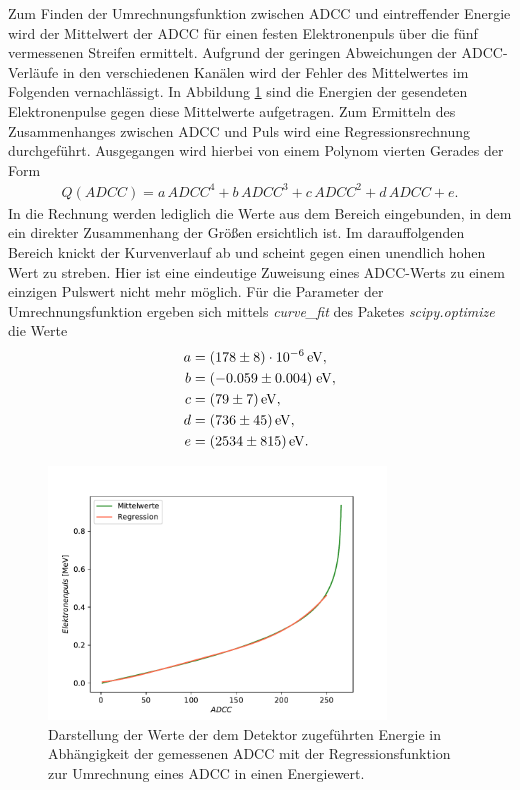 Zum Finden der Umrechnungsfunktion zwischen ADCC und eintreffender Energie wird der Mittelwert der ADCC für einen festen Elektronenpuls über die fünf vermessenen Streifen ermittelt. Aufgrund der geringen Abweichungen der ADCC-Verläufe in den verschiedenen Kanälen wird der Fehler des Mittelwertes im Folgenden vernachlässigt. In Abbildung \ref{fig:Regression} sind die Energien der gesendeten Elektronenpulse gegen diese Mittelwerte aufgetragen. Zum Ermitteln des Zusammenhanges zwischen ADCC und Puls wird eine Regressionsrechnung durchgeführt. Ausgegangen wird hierbei von einem Polynom vierten Gerades der Form
\begin{align}
  Q(ADCC) = a\,ADCC^4 + b\,ADCC^3 + c\,ADCC^2 + d\,ADCC + e.
  \label{eq:Kalib}
\end{align}
In die Rechnung werden lediglich die Werte aus dem Bereich eingebunden, in dem ein direkter Zusammenhang der Größen ersichtlich ist. Im darauffolgenden Bereich knickt der Kurvenverlauf ab und scheint gegen einen unendlich hohen Wert zu streben. Hier ist eine eindeutige Zuweisung eines ADCC-Werts zu einem einzigen Pulswert nicht mehr möglich.
Für die Parameter der Umrechnungsfunktion ergeben sich mittels \textit{curve\_fit} des Paketes \textit{scipy.optimize} die Werte
\begin{align*}
  a &= \SI{178 (8)e-6}{\electronvolt},\\
  b &= (-0.059 \pm 0.004) \; \si{\electronvolt},\\
  c &= \SI{79(7)}{\electronvolt},\\
  d &= \SI{736(45)}{\electronvolt},\\
  e &= \SI{2534(815)}{\electronvolt}.
\end{align*}

\begin{figure}
  \centering
  \includegraphics[width=0.8\textwidth]{plots/Kalibrationsregression.pdf}
  \caption{Darstellung der Werte der dem Detektor zugeführten Energie in Abhängigkeit der gemessenen ADCC mit der Regressionsfunktion zur Umrechnung eines ADCC in einen Energiewert.}
  \label{fig:Regression}
\end{figure}
\FloatBarrier

